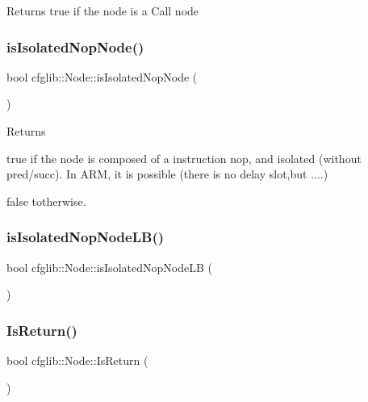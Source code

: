 Returns true if the node is a Call node \mbox{\label{classcfglib_1_1Node_a52c4537c5aac77699ab900b8b60a14eb}} 
\subsubsection{\texorpdfstring{is\+Isolated\+Nop\+Node()}{isIsolatedNopNode()}}
{\footnotesize\ttfamily bool cfglib\+::\+Node\+::is\+Isolated\+Nop\+Node (\begin{DoxyParamCaption}{ }\end{DoxyParamCaption})}

\begin{DoxyReturn}{Returns}

\begin{DoxyItemize}
\item true if the node is composed of a instruction nop, and isolated (without pred/succ). In A\+RM, it is possible (there is no delay slot,but ....)
\item false totherwise. 
\end{DoxyItemize}
\end{DoxyReturn}
\mbox{\label{classcfglib_1_1Node_a9063f79cf7bf36717b23a71c4027142e}} 
\subsubsection{\texorpdfstring{is\+Isolated\+Nop\+Node\+L\+B()}{isIsolatedNopNodeLB()}}
{\footnotesize\ttfamily bool cfglib\+::\+Node\+::is\+Isolated\+Nop\+Node\+LB (\begin{DoxyParamCaption}{ }\end{DoxyParamCaption})}

\mbox{\label{classcfglib_1_1Node_a879a88114917dcc1084aeab10bd83732}} 
\subsubsection{\texorpdfstring{Is\+Return()}{IsReturn()}}
{\footnotesize\ttfamily bool cfglib\+::\+Node\+::\+Is\+Return (\begin{DoxyParamCaption}{ }\end{DoxyParamCaption})}

